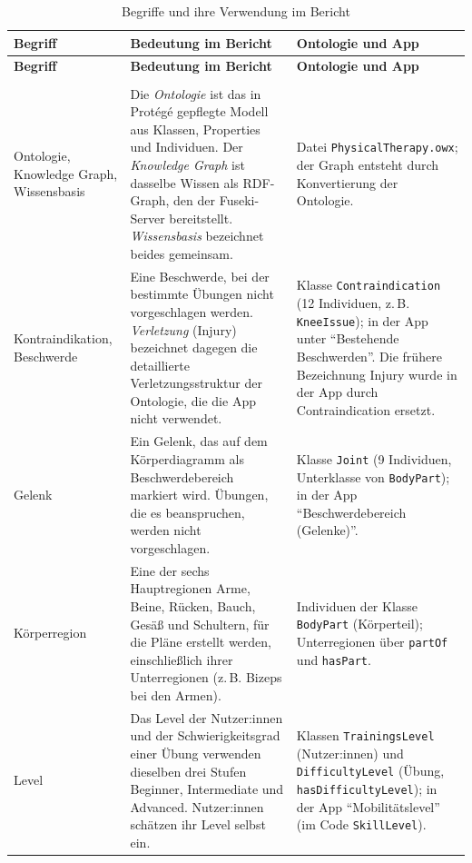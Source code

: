 {\renewcommand{\arraystretch}{1.3}
\begin{xltabular}{\textwidth}{@{} >{\raggedright\arraybackslash}p{3.0cm} >{\raggedright\arraybackslash}X >{\raggedright\arraybackslash}p{5.3cm} @{}}
    \caption{Begriffe und ihre Verwendung im Bericht}
    \label{tab:begriffe} \\
    \toprule
    \textbf{Begriff} & \textbf{Bedeutung im Bericht} & \textbf{Ontologie und App} \\
    \midrule
    \endfirsthead
    \toprule
    \textbf{Begriff} & \textbf{Bedeutung im Bericht} & \textbf{Ontologie und App} \\
    \midrule
    \endhead
    \midrule
     \\
    \endfoot
    \bottomrule
    \endlastfoot
    Ontologie, Knowledge Graph, Wissensbasis & Die \emph{Ontologie} ist das in Protégé gepflegte Modell aus Klassen, Properties und Individuen. Der \emph{Knowledge Graph} ist dasselbe Wissen als RDF-Graph, den der Fuseki-Server bereitstellt. \emph{Wissensbasis} bezeichnet beides gemeinsam. & Datei \texttt{PhysicalTherapy.owx}; der Graph entsteht durch Konvertierung der Ontologie. \\
    Kontraindikation, Beschwerde & Eine Beschwerde, bei der bestimmte Übungen nicht vorgeschlagen werden. \emph{Verletzung} (Injury) bezeichnet dagegen die detaillierte Verletzungsstruktur der Ontologie, die die App nicht verwendet. & Klasse \texttt{Contraindication} (12 Individuen, z.\,B. \texttt{KneeIssue}); in der App unter ``Bestehende Beschwerden''. Die frühere Bezeichnung Injury wurde in der App durch Contraindication ersetzt. \\
    Gelenk & Ein Gelenk, das auf dem Körperdiagramm als Beschwerdebereich markiert wird. Übungen, die es beanspruchen, werden nicht vorgeschlagen. & Klasse \texttt{Joint} (9 Individuen, Unterklasse von \texttt{BodyPart}); in der App ``Beschwerdebereich (Gelenke)''. \\
    Körperregion & Eine der sechs Hauptregionen Arme, Beine, Rücken, Bauch, Gesäß und Schultern, für die Pläne erstellt werden, einschließlich ihrer Unterregionen (z.\,B. Bizeps bei den Armen). & Individuen der Klasse \texttt{BodyPart} (Körperteil); Unterregionen über \texttt{partOf} und \texttt{hasPart}. \\
    Level & Das Level der Nutzer:innen und der Schwierigkeitsgrad einer Übung verwenden dieselben drei Stufen Beginner, Intermediate und Advanced. Nutzer:innen schätzen ihr Level selbst ein. & Klassen \texttt{TrainingsLevel} (Nutzer:innen) und \texttt{DifficultyLevel} (Übung, \texttt{hasDifficultyLevel}); in der App ``Mobilitätslevel'' (im Code \texttt{SkillLevel}). \\

\end{xltabular}}
